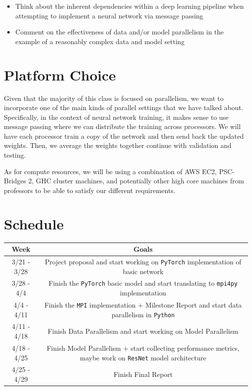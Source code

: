 \documentclass{article}
\begin{document}
\begin{itemize}
  \item Think about the inherent dependencies within a deep learning pipeline when attempting to implement a neural network via message passing
  \item Comment on the effectiveness of data and/or model parallelism in the example of a reasonably complex data and model setting
\end{itemize}

\section*{Platform Choice} Given that the majority of this class is focused on parallelism, we want to incorporate one of the main kinds of parallel settings that we have talked about. Specifically, in the context of neural network training, it makes sense to use message passing where we can distribute the training across processors. We will have each processor train a copy of the network and then send back the updated weights. Then, we average the weights together continue with validation and testing.

As for compute resources, we will be using a combination of AWS EC2, PSC-Bridges 2, GHC cluster machines, and potentially other high core machines from professors to be able to satisfy our different requirements.

\section*{Schedule}

\begin{center}
	\begin{tabular}{ |c|c| }
		\hline
		Week & Goals \\
		\hline
		3/21 - 3/28 & Project proposal and start working on \texttt{PyTorch} implementation of basic network \\
		\hline
		3/28 - 4/4 & Finish the \texttt{PyTorch} basic model and start translating to \texttt{mpi4py} implementation\\
		\hline
		4/4 - 4/11 & Finish the \texttt{MPI} implementation + Milestone Report and start data parallelism in \texttt{Python} \\
		\hline
		4/11 - 4/18 & Finish Data Parallelism and start working on Model Parallelism\\
		\hline
		4/18 - 4/25 & Finish Model Parallelism + start collecting performance metrics, maybe work on \texttt{ResNet} model architecture\\
		\hline
		4/25 - 4/29 & Finish Final Report\\
		\hline
	\end{tabular}\\
\end{center}
\end{document}
